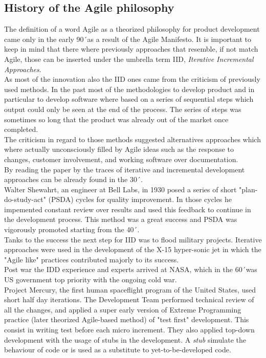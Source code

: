 \documentclass[../main.tex]{subfiles}
\begin{document}
\subsection{History of the Agile philosophy}
The definition of a word Agile as a theorized philosophy for product development came only in the early 90´as a result of the Agile Manifesto. It is important to keep in mind that there where previously approaches that resemble, if not match Agile, those can be inserted under the umbrella term IID, \textit{Iterative Incremental Approaches}.\\
As most of the innovation also the IID ones came from the criticism of previously used methods. In the past most of the methodologies to develop product and in particular to develop software where based on a series of sequential steps which output could only be seen at the end of the process. The series of steps was sometimes so long that the product was already out of the market once completed.\\
The criticism in regard to those methods suggested alternatives approaches which where actually unconsciously filled by Agile ideas such as the response to changes, customer involvement, and working software over documentation.\\
By reading the paper by \citet{larman2003iterative} the traces of iterative and incremental development approaches can be already found in the 30´. \\
Walter Shewahrt, an engineer at Bell Labs, in 1930 posed a series of short "plan-do-study-act" (PSDA) cycles for quality improvement. In those cycles he impemented constant review over results and used this feedback to continue in the development process. This method was a great success and PSDA was vigorously promoted starting from the 40´.\\ 
Tanks to the success the next step for IID was to flood military projects. Iterative approaches were used in the development of the X-15 hyper-sonic jet in which the "Agile like" practices contributed majorly to its success.\\ Post war the IDD experience and experts arrived at NASA, which in the 60´was US government top priority with the ongoing cold war.\\
Project Mercury, the first human spaceflight program of the United States, used short half day iterations. The Development Team performed technical review of all the changes, and applied a super early version of Extreme Programming practice (later theorized Agile-based method) of "test first" development. This consist in writing test before each micro increment. They also applied top-down development with the usage of stubs in the development. A \textit{stub} simulate the behaviour of code or is used as a substitute to yet-to-be-developed code.\\ 
\end{document}
